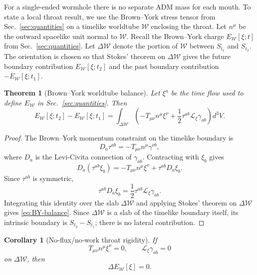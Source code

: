 \documentclass[aps,prd,10pt,onecolumn,nofootinbib,superscriptaddress,floatfix]{revtex4-2}
\newtheorem{theorem}{Theorem}
\newtheorem{corollary}{Corollary}
\begin{document}
For a single-ended wormhole there is no separate ADM mass for each mouth.  To
state a local throat result, we use the Brown--York stress tensor from
Sec.~\ref{sec:quantities} on a timelike worldtube $\mathcal W$ enclosing the
throat.  Let $n^\mu$ be the outward spacelike unit normal to $\mathcal W$.
Recall the Brown--York charge $E_{\mathcal W}[\xi;t]$ from
Sec.~\ref{sec:quantities}.  Let $\Delta\mathcal W$ denote the portion of
$\mathcal W$ between $S_{t_1}$ and $S_{t_2}$.  The orientation is chosen so
that Stokes' theorem on $\Delta\mathcal W$ gives the future boundary
contribution $E_{\mathcal W}[\xi;t_2]$ and the past boundary contribution
$-E_{\mathcal W}[\xi;t_1]$.

\begin{theorem}[Brown--York worldtube balance]
\label{thm:BY-balance}
Let $\xi^a$ be the time flow used to define $E_{\mathcal W}$ in
Sec.~\ref{sec:quantities}.  Then
\begin{equation}
\label{eq:BY-balance}
  E_{\mathcal W}[\xi;t_2]-E_{\mathcal W}[\xi;t_1]
  =
  \int_{\Delta\mathcal W}
  \left(
    -T_{\mu\nu}n^\mu\xi^\nu
    +\frac12\tau^{ab}\mathcal L_\xi\gamma_{ab}
  \right)d^3V .
\end{equation}
\end{theorem}

\begin{proof}
The Brown--York momentum constraint on the timelike boundary is
\cite{BrownYork1993Quasilocal,EppMcGrathMann2013Momentum}
\begin{equation}
  D_a\tau^{ab}=-T_{\mu\nu}n^\mu\gamma^{\nu b},
\end{equation}
where $D_a$ is the Levi-Civita connection of $\gamma_{ab}$.  Contracting with
$\xi_b$ gives
\begin{equation}
  D_a(\tau^{ab}\xi_b)
  =
  -T_{\mu\nu}n^\mu\xi^\nu+\tau^{ab}D_a\xi_b.
\end{equation}
Since $\tau^{ab}$ is symmetric,
\begin{equation}
  \tau^{ab}D_a\xi_b=\frac12\tau^{ab}\mathcal L_\xi\gamma_{ab}.
\end{equation}
Integrating this identity over the slab $\Delta\mathcal W$ and applying
Stokes' theorem on $\Delta\mathcal W$ gives \eqref{eq:BY-balance}.  Since
$\Delta\mathcal W$ is a slab of the timelike boundary itself, its intrinsic
boundary is $S_{t_2}-S_{t_1}$; there is no lateral contribution.
\end{proof}

\begin{corollary}[No-flux/no-work throat rigidity]
\label{cor:zero-flux}
If
\begin{equation}
  T_{\mu\nu}n^\mu\xi^\nu=0,
  \qquad
  \mathcal L_\xi\gamma_{ab}=0
\end{equation}
on $\Delta\mathcal W$, then
\begin{equation}
  \Delta E_{\mathcal W}[\xi]=0.
\end{equation}
\end{corollary}
\end{document}
